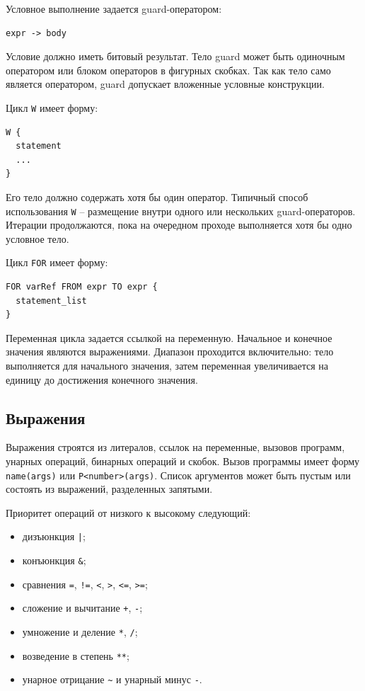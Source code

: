 Условное выполнение задается guard-оператором:
\begin{verbatim}
expr -> body
\end{verbatim}
Условие должно иметь битовый результат.
Тело guard может быть одиночным оператором или блоком операторов в фигурных скобках.
Так как тело само является оператором, guard допускает вложенные условные конструкции.

Цикл \texttt{W} имеет форму:
\begin{verbatim}
W {
  statement
  ...
}
\end{verbatim}
Его тело должно содержать хотя бы один оператор.
Типичный способ использования \texttt{W} -- размещение внутри одного или нескольких guard-операторов.
Итерации продолжаются, пока на очередном проходе выполняется хотя бы одно условное тело.

Цикл \texttt{FOR} имеет форму:
\begin{verbatim}
FOR varRef FROM expr TO expr {
  statement_list
}
\end{verbatim}
Переменная цикла задается ссылкой на переменную.
Начальное и конечное значения являются выражениями.
Диапазон проходится включительно: тело выполняется для начального значения, затем переменная увеличивается на единицу до достижения конечного значения.

\subsection{Выражения}
Выражения строятся из литералов, ссылок на переменные, вызовов программ, унарных операций, бинарных операций и скобок.
Вызов программы имеет форму \texttt{name(args)} или \texttt{P<number>(args)}.
Список аргументов может быть пустым или состоять из выражений, разделенных запятыми.

Приоритет операций от низкого к высокому следующий:
\begin{itemize}
	\item дизъюнкция \texttt{|};
	\item конъюнкция \texttt{\&};
	\item сравнения \texttt{=}, \texttt{!=}, \texttt{<}, \texttt{>}, \texttt{<=}, \texttt{>=};
	\item сложение и вычитание \texttt{+}, \texttt{-};
	\item умножение и деление \texttt{*}, \texttt{/};
	\item возведение в степень \texttt{**};
	\item унарное отрицание \texttt{\textasciitilde} и унарный минус \texttt{-}.
\end{itemize}

